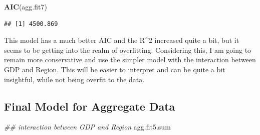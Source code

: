 \documentclass[11pt,]{article}
\newenvironment{Shaded}{\begin{snugshade}}{\end{snugshade}}
\newcommand{\CommentTok}[1]{\textcolor[rgb]{0.56,0.35,0.01}{\textit{#1}}}
\newcommand{\KeywordTok}[1]{\textcolor[rgb]{0.13,0.29,0.53}{\textbf{#1}}}
\newcommand{\NormalTok}[1]{#1}
\begin{document}
\begin{Shaded}
\begin{Highlighting}[]
\KeywordTok{AIC}\NormalTok{(agg.fit7)}
\end{Highlighting}
\end{Shaded}

\begin{verbatim}
## [1] 4500.869
\end{verbatim}

This model has a much better AIC and the R\^{}2 increased quite a bit,
but it seems to be getting into the realm of overfitting. Considering
this, I am going to remain more conservative and use the simpler model
with the interaction between GDP and Region. This will be easier to
interpret and can be quite a bit insightful, while not being overfit to
the data.

\hypertarget{final-model-for-aggregate-data}{%
\subsection{Final Model for Aggregate
Data}\label{final-model-for-aggregate-data}}

\begin{Shaded}
\begin{Highlighting}[]
\CommentTok{## interaction between GDP and Region}
\NormalTok{agg.fit5.sum}
\end{Highlighting}
\end{Shaded}
\end{document}

